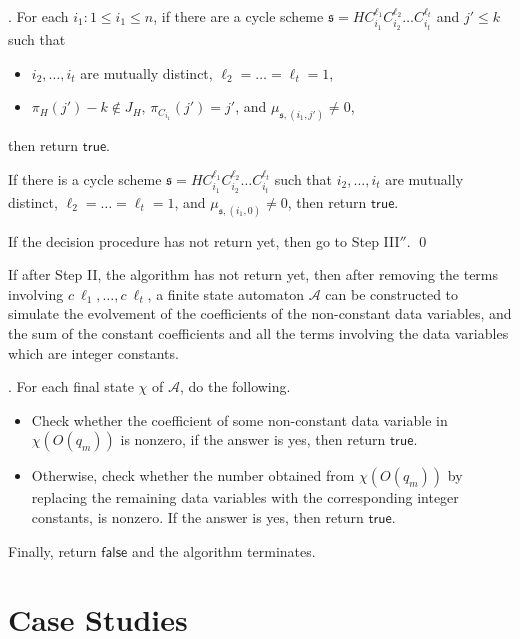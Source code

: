 \documentclass[runningheads,a4paper]{llncs}
\def\Aa{{\mathcal{A} }}
\def\schm{{\mathfrak{s} }}
\newcommand\ltrue{\mathsf{true}}
\newcommand\lfalse{\mathsf{false}}
\begin{document}
\medskip

. For each $i_1: 1 \le i_1 \le n$, if there are a cycle scheme $\schm=HC_{i_1}^{\ell_1} C_{i_2}^{\ell_2} \dots C_{i_t}^{\ell_t}$  and $j' \le k$ such that 
\begin{itemize}
\item $i_2,\dots,i_t$ are mutually distinct, $\ell_2 = \dots = \ell_t = 1$, 
%
\item $\pi_H(j')-k \not \in J_H$, $\pi_{C_{i_1}}(j')=j'$, and $\mu_{\schm,(i_1,j')} \neq 0$, 
\end{itemize}
then return $\ltrue$.

If there is a cycle scheme $\schm=HC_{i_1}^{\ell_1} C_{i_2}^{\ell_2} \dots C_{i_t}^{\ell_t}$ such that 
$i_2,\dots,i_t$ are mutually distinct, $\ell_2 = \dots = \ell_t = 1$, 
%
and $\mu_{\schm,(i_1,0)} \neq 0$, 
%
then return $\ltrue$. 

If the decision procedure has not return yet, then go to Step III$''$. \qed

\medskip

If after Step II, the algorithm has not return yet, then after removing the terms involving $c\ \ell_1,\dots, c\ \ell_t$, a finite state automaton $\Aa$ can be constructed to simulate the evolvement of the coefficients of the non-constant data variables, and the sum of the constant coefficients and all the terms involving the data variables which are integer constants. 

\medskip



. For each final state $\chi$ of $\Aa$, do the following.
\begin{itemize}
\item Check whether the coefficient of some non-constant data variable in $\chi(O(q_m))$ is nonzero, if the answer is yes, then return $\ltrue$.
%
\item Otherwise, check whether the number obtained from $\chi(O(q_m))$ by replacing the remaining data variables with the corresponding integer constants, is nonzero. If the answer is yes, then return $\ltrue$. 
\end{itemize}
Finally, return $\lfalse$ and the algorithm terminates.



\section{Case Studies}
\end{document}
